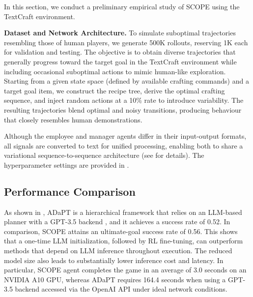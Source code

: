 In this section, we conduct a preliminary empirical study of SCOPE using the TextCraft environment. 


\textbf{Dataset and Network Architecture.} To simulate suboptimal trajectories resembling those of human players, we generate 500K rollouts, reserving 1K each for validation and testing. The objective is to obtain diverse trajectories that generally progress toward the target goal in the TextCraft environment while including occasional suboptimal actions to mimic human-like exploration. Starting from a given state space (defined by available crafting commands) and a target goal item, we construct the recipe tree, derive the optimal crafting sequence, and inject random actions at a 10\% rate to introduce variability. The resulting trajectories blend optimal and noisy transitions, producing behaviour that closely resembles human demonstrations.  

Although the employee and manager agents differ in their input-output formats, all signals are converted to text for unified processing, enabling both to share a variational sequence-to-sequence architecture (see  for details). The hyperparameter settings are provided in . 





\subsection{Performance Comparison}
As shown in , ADaPT \citep{PrasadKHCSBK2024} is a hierarchical framework that relies on an LLM-based planner with a GPT-3.5 backend \citep{BrownMRSSKD2020}, and it achieves a success rate of 0.52. In comparison, SCOPE attains an ultimate-goal success rate of 0.56. This shows that a one-time LLM initialization, followed by RL fine-tuning, can outperform methods that depend on LLM inference throughout execution.
The reduced model size also leads to substantially lower inference cost and latency. In particular, SCOPE agent completes the game in an average of 3.0 seconds on an NVIDIA A10 GPU, whereas ADaPT requires 164.4 seconds when using a GPT-3.5 backend accessed via the OpenAI API under ideal network conditions.


